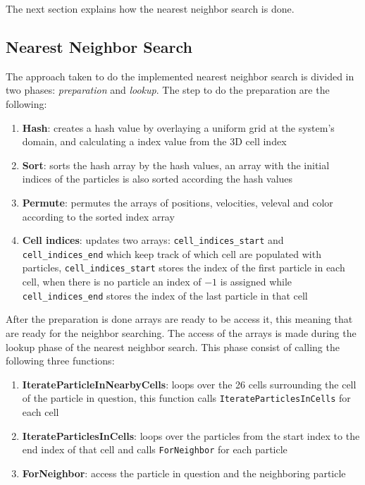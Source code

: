 The next section explains how the nearest neighbor search is done. 

\subsection{Nearest Neighbor Search}
The approach taken to do the implemented nearest neighbor search is divided in two phases: \textit{preparation} and \textit{lookup}. The step to do the preparation are the following:

\begin{enumerate}
\item{\textbf{Hash}: creates a hash value by overlaying a uniform grid at the system's domain, and calculating a index value from the 3D cell index}
\item{\textbf{Sort}: sorts the hash array by the hash values, an array with the initial indices of the particles is also sorted according the hash values}
\item{\textbf{Permute}:  permutes the arrays of positions, velocities, veleval and color according to the sorted index array}
\item{\textbf{Cell indices}: updates two arrays: \texttt{cell\_indices\_start} and \texttt{cell\_indices\_end} which keep track of which cell are populated with particles, \texttt{cell\_indices\_start} stores the index of the first particle in each cell, when there is no particle an index of $-1$ is assigned while \texttt{cell\_indices\_end} stores the index of the last particle in that cell}
\end{enumerate}

After the preparation is done arrays are ready to be access it, this meaning that are ready for the neighbor searching. The access of  the arrays is made during the lookup phase of the nearest neighbor search. This phase consist of calling the following three functions:

\begin{enumerate}
\item{\textbf{IterateParticleInNearbyCells}: loops over the 26 cells surrounding the cell of the particle in question, this function calls \texttt{IterateParticlesInCells} for each cell }
\item{\textbf{IterateParticlesInCells}: loops over the particles from the start index to the end index of that cell and calls \texttt{ForNeighbor} for each particle}
\item{\textbf{ForNeighbor}: access the particle in question and the neighboring particle}
\end{enumerate}

